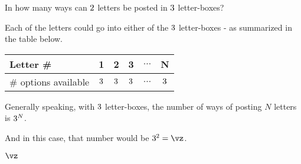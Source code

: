



\POWER\vb\va\vz

\question[4] In how many ways can $2$ letters be posted in $3$ letter-boxes? 

\watchout

\begin{solution}[\mcq]
  Each of the letters could go into either of the $3$ letter-boxes - 
  as summarized in the table below.

  \begin{tabular}{l c c c c c}
    \toprule
      Letter \# & 1 & 2 & 3 & $\ldots$ & N \\
    \midrule
      \# options available & $3$ & $3$ & $3$ & $\ldots$ & $3$ \\
    \bottomrule
  \end{tabular}

  Generally speaking, with $3$ letter-boxes, the number of ways of posting $N$ letters is $3^N$. 

  And in this case, that number would be $\vb^{\va} = \vz$.
\end{solution}

\ifprintanswers\begin{codex}$\vz$\end{codex}\fi

